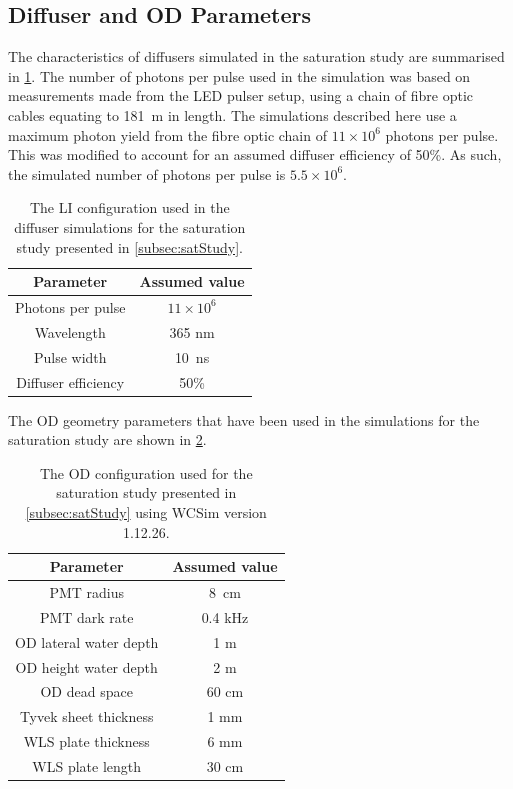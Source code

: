 \documentclass[a4paper,11pt]{article}
\begin{document}
\subsection{Diffuser and OD Parameters}\label{subsec:params}

The characteristics of diffusers simulated in the saturation study are summarised in \cref{tab:satStudyParams}. The number of photons per pulse used in the simulation was based on measurements made from the LED pulser setup, using a chain of fibre optic cables equating to 181~m in length. The simulations described here use a maximum photon yield from the fibre optic chain of $11\times10^6$ photons per pulse.  This was modified to account for an assumed diffuser efficiency of 50\%. As such, the simulated number of photons per pulse is $5.5\times10^6$.

\begin{table}[h!]
    \centering
    \begin{tabular}{|c|c|}
    \hline
        Parameter    & Assumed value \\
        \hline
       Photons per pulse  &  $11\times10^6$\\
       Wavelength  & 365 nm \\
       Pulse width & 10~ns\\
       Diffuser efficiency & 50\%\\
       \hline
    \end{tabular}
    \caption{The LI configuration used in the diffuser simulations for the saturation study presented in \cref{subsec:satStudy}.}
    \label{tab:satStudyParams}
\end{table}

The OD geometry parameters that have been used in the simulations for the saturation study are shown in \cref{tab:od_config}.

\begin{table}[h!]
    \centering
    \begin{tabular}{|c|c|}
    \hline
        Parameter    & Assumed value \\
        \hline
       PMT radius  &  8~cm\\
       PMT dark rate & 0.4 kHz \\
       OD lateral water depth  & 1 m \\
       OD height water depth & 2 m\\
       OD dead space & 60 cm \\
       Tyvek sheet thickness & 1 mm\\
       WLS plate thickness & 6 mm \\
       WLS plate length & 30 cm \\
       \hline
    \end{tabular}
    \caption{The OD configuration used for the saturation study presented in \cref{subsec:satStudy} using WCSim version 1.12.26.}
    \label{tab:od_config}
\end{table}
\end{document}
